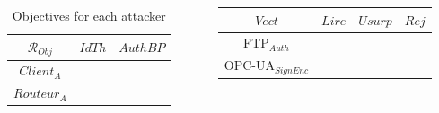 \documentclass{beamer}
\newcommand{\ftpauth}{FTP$_{Auth}$\xspace}
\newcommand{\opcuasignenc}{OPC-UA$_{SignEnc}$\xspace}
\newcommand{\cmark}{{\color{green}\ding{51}}}%
\newcommand{\xmark}{}%
\begin{document}
\begin{frame}[fragile]{}
\begin{tcolorbox}[adjusted title={\centering\large Attack models}]
\begin{columns}[T]
\begin{column}{.65\textwidth}
\begin{tcolorbox}
                    \vspace{-.75em}
                    \begin{columns}[c]
                        \hspace{.1cm}
                        \begin{column}{.3\textwidth}
                            \begin{table}[htb]
                                \vspace{1.15em}
                                \centering
                                \begin{tabular}{|c|c|c|}
                                    \hline
                                    $\mathcal{R}_{Obj}$ & $IdTh$   & $AuthBP$    \\
                                    \hline
                                    $Client_{A}$        & \xmark    & \cmark     \\
                                    \hline
                                    $Routeur_{A}$       & \cmark    & \xmark     \\
                                    \hline
                                \end{tabular}
                                \caption{Objectives for each attacker}
                                \label{tab:ex_robj}
                            \end{table}
                        \end{column}
                        \begin{column}{.3\textwidth}
                            \begin{table}[htb]
                                \centering
                                \vspace{-.25em}
                                \begin{tabular}{|c|c|c|c|}
                                    \hline
                                    $Vect$          & $Lire$    & $Usurp$   & $Rej$     \\
                                    \hline
                                    \ftpauth        & \cmark    & \xmark    & \cmark    \\
                                    \hline
                                    \opcuasignenc   & \xmark    & \xmark    & \xmark    \\
                                    \hline
                                \end{tabular}

\end{table}
\end{column}
\end{columns}
\end{tcolorbox}
\end{column}
\end{columns}
\end{tcolorbox}
\end{frame}
\end{document}
